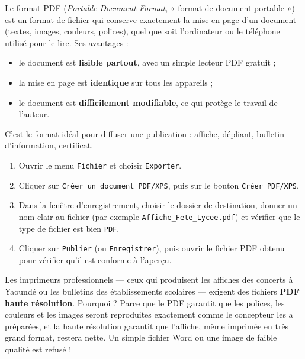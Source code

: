 \documentclass[11pt]{article}
\newcommand{\cle}[1]{{\popxbold\color{popdark}#1}}
\begin{document}
\begin{definition}
Le format \cle{PDF} (\emph{Portable Document Format}, « format de document portable ») est un format de fichier qui conserve exactement la mise en page d'un document (textes, images, couleurs, polices), quel que soit l'ordinateur ou le téléphone utilisé pour le lire. Ses avantages :
\begin{itemize}
\item le document est \textbf{lisible partout}, avec un simple lecteur PDF gratuit ;
\item la mise en page est \textbf{identique} sur tous les appareils ;
\item le document est \textbf{difficilement modifiable}, ce qui protège le travail de l'auteur.
\end{itemize}
C'est le format idéal pour diffuser une publication : affiche, dépliant, bulletin d'information, certificat.
\end{definition}

\begin{methode}
\begin{enumerate}
\item Ouvrir le menu \texttt{Fichier} et choisir \texttt{Exporter}.
\item Cliquer sur \texttt{Créer un document PDF/XPS}, puis sur le bouton \texttt{Créer PDF/XPS}.
\item Dans la fenêtre d'enregistrement, choisir le dossier de destination, donner un nom clair au fichier (par exemple \texttt{Affiche\_Fete\_Lycee.pdf}) et vérifier que le type de fichier est bien \texttt{PDF}.
\item Cliquer sur \texttt{Publier} (ou \texttt{Enregistrer}), puis ouvrir le fichier PDF obtenu pour vérifier qu'il est conforme à l'aperçu.
\end{enumerate}
\end{methode}

\begin{savaistu}
Les imprimeurs professionnels — ceux qui produisent les affiches des concerts à Yaoundé ou les bulletins des établissements scolaires — exigent des fichiers \textbf{PDF haute résolution}. Pourquoi ? Parce que le PDF garantit que les polices, les couleurs et les images seront reproduites exactement comme le concepteur les a préparées, et la haute résolution garantit que l'affiche, même imprimée en très grand format, restera nette. Un simple fichier Word ou une image de faible qualité est refusé !
\end{savaistu}
\end{document}
